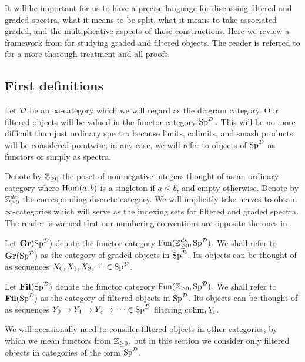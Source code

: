 
It will be important for us to have a precise language for discussing filtered and graded spectra, what it means to be split, what it means to take associated graded, and the multiplicative aspects of these constructions. Here we review a framework from \cite{LurieRot} for studying graded and filtered objects.  The reader is referred to \cite{LurieRot} for a more thorough treatment and all proofs.  

\subsection{First definitions}
Let $\operatorname{\mathcal{D}}$ be an $\infty$-category which we will regard as the diagram category.  Our filtered objects will be valued in the functor category $\operatorname{\mathrm{Sp}}^{\operatorname{\mathcal{D}}}.$  This will be no more difficult than just ordinary spectra because limits, colimits, and smash products will be considered pointwise; in any case, we will refer to objects of $\operatorname{\mathrm{Sp}}^{\operatorname{\mathcal{D}}}$ as functors or simply as spectra.  

Denote by $\operatorname{\mathbb{Z}}_{\geq 0}$ the poset of non-negative integers thought of as an ordinary category where $\operatorname{\text{Hom}}(a,b)$ is a singleton if $a\leq b$, and empty otherwise.  Denote by $\operatorname{\mathbb{Z}}_{\geq 0}^{ds}$ the corresponding discrete category.  We will implicitly take nerves to obtain $\infty$-categories which will serve as the indexing sets for filtered and graded spectra.  The reader is warned that our numbering conventions are opposite the ones in \cite{LurieRot}.

\begin{dfn} 
Let $\operatorname{\mathbf{Gr}}(\operatorname{\mathrm{Sp}}^{\operatorname{\mathcal{D}}})$ denote the functor category $\operatorname{\text{Fun}}(\operatorname{\mathbb{Z}}_{\geq 0}^{ds}, \operatorname{\mathrm{Sp}}^{\operatorname{\mathcal{D}}}).$  We shall refer to $\operatorname{\mathbf{Gr}}(\operatorname{\mathrm{Sp}}^{\operatorname{\mathcal{D}}})$ as the category of graded objects in $\operatorname{\mathrm{Sp}}^{\operatorname{\mathcal{D}}}$.  Its objects can be thought of as sequences $X_0, X_1,X_2,\cdots \in \operatorname{\mathrm{Sp}}^{\operatorname{\mathcal{D}}}$.
\end{dfn}

\begin{dfn} 
Let $\operatorname{\mathbf{Fil}}(\operatorname{\mathrm{Sp}}^{\operatorname{\mathcal{D}}})$ denote the functor category $\operatorname{\text{Fun}}(\operatorname{\mathbb{Z}}_{\geq 0}, \operatorname{\mathrm{Sp}}^{\operatorname{\mathcal{D}}}).$  We shall refer to $\operatorname{\mathbf{Fil}}(\operatorname{\mathrm{Sp}}^{\operatorname{\mathcal{D}}})$ as the category of filtered objects in $\operatorname{\mathrm{Sp}}^{\operatorname{\mathcal{D}}}$.  Its objects can be thought of as sequences $Y_0\to Y_1\to Y_2 \to \cdots \in \operatorname{\mathrm{Sp}}^{\operatorname{\mathcal{D}}}$ filtering $\operatorname*{\mathrm{colim}}_i Y_i$.  
\end{dfn}

\begin{rmk}
We will occasionally need to consider filtered objects in other categories, by which we mean functors from $\operatorname{\mathbb{Z}}_{\geq 0}$, but in this section we consider only filtered objects in categories of the form $\operatorname{\mathrm{Sp}}^{\operatorname{\mathcal{D}}}$.  
\end{rmk}


